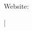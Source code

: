 \documentclass[letterpaper,10pt]{article}
\begin{document}
\href{\AuthorWebsiteLink}{\scshape\huge\Author}\vspace{2pt}

\begin{small}
  Website: \href{\AuthorWebsiteLink}{\AuthorWebsiteText}

  \vspace{2pt}\AuthorAddress

  \vspace{2pt}\href{mailto:\AuthorEmail}{\AuthorEmail} |
  \href{\AuthorPhoneLink}{\AuthorPhoneText}
\end{small}


\vspace{-82pt}
\end{document}

